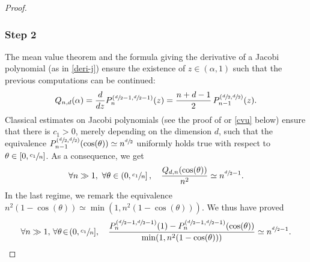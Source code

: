 \begin{proof}
\subsubsection*{Step 2}
The mean value theorem and the formula giving the derivative of a Jacobi polynomial (as in \eqref{deri-j}) ensure the existence of $z\in (\alpha,1)$ such that the previous computations can be continued:
\begin{equation*}
Q_{n,d}(\alpha)=\frac{d}{dz} P_n^{(\sfrac{d}{2}-1,\sfrac{d}{2}-1)} (z)=\frac{n+d-1}{2}\,P_{n-1}^{(\sfrac{d}{2},\sfrac{d}{2})}(z).
\end{equation*}
Classical estimates on Jacobi polynomials (see the proof of \cite[Lem.\,3.9]{imek-crusep} or \eqref{cvu} below) ensure that there is $c_1>0$, merely depending on the dimension $d$, such that the equivalence $P_{n-1}^{(\sfrac{d}{2},\sfrac{d}{2})}(\cos(\theta))\simeq n^{\sfrac{d}{2}}$ uniformly holds true with respect to $\theta\in \left[0,\sfrac{c_1}{n}\right]$.
As a consequence, we get
\begin{equation*}
\forall n\gg 1,\ \forall \theta \in \left(0,\sfrac{c_1}{n}\right], \quad \frac{Q_{d,n}(\cos(\theta))}{n^2}\simeq n^{\sfrac{d}{2}-1}.
\end{equation*}
In the last regime, we remark the equivalence $n^2(1-\cos(\theta))\simeq \min(1,n^2(1-\cos(\theta)))$. We thus have proved
\begin{equation}\label{step3}
\forall n\gg 1,\, \forall \theta \!\in\!(0,\sfrac{c_1}{n}], \quad
\frac{P_{n}^{(\sfrac{d}{2}-1,\sfrac{d}{2}-1)}(1)-P_{n}^{(\sfrac{d}{2}-1,\sfrac{d}{2}-1)}(\cos(\theta))}{\min(1,n^2(1-\cos(\theta)))}\simeq n^{\sfrac{d}{2}-1}.
\end{equation}


\end{proof}
